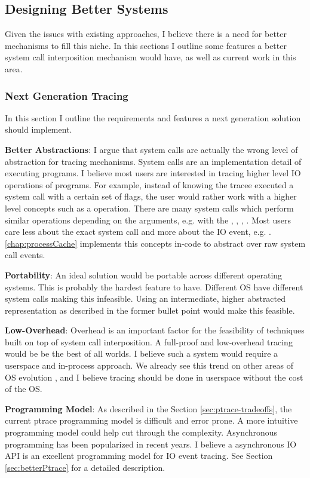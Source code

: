 \subsection{Designing Better Systems}
Given the issues with existing approaches, I believe there is a need for better mechanisms to fill this niche. In this sections I outline some features a better system call interposition mechanism would have, as well as current work in this area.

\subsubsection{Next Generation Tracing}
In this section I outline the requirements and features a next generation solution should implement.
\begin{compactitem}
\item \textbf{Better Abstractions}: I argue that system calls are actually the wrong level of abstraction for tracing mechanisms. System calls are an implementation detail of executing programs. I believe most users are interested in tracing higher level IO operations of programs. For example, instead of knowing the tracee executed a  system call with a certain set of flags, the user would rather work with a higher level concepts such as a  operation. There are many system calls which perform similar operations depending on the arguments, e.g.  with the , , , . Most users care less about the exact system call and more about the IO event, e.g. . \pc \ref{chap:processCache} implements this concepts in-code to abstract over raw system call events. 
\item \textbf{Portability}: An ideal solution would be portable across different operating systems. This is probably the hardest feature to have. Different OS have different system calls making this infeasible. Using an intermediate, higher abstracted representation as described in the former bullet point would make this feasible.
\item \textbf{Low-Overhead}: Overhead is an important factor for the feasibility of techniques built on top of system call interposition. A full-proof and low-overhead tracing would be be the best of all worlds. I believe such a system would require a userspace and in-process approach. We already see this trend on other areas of OS evolution \cite{demikernel}, and I believe tracing should be done in userspace without the cost of the OS.
\item \textbf{Programming Model}: As described in the Section \ref{sec:ptrace-tradeoffs}, the current ptrace programming model is difficult and error prone. A more intuitive programming model could help cut through the complexity. Asynchronous programming has been popularized in recent years. I believe a asynchronous IO API is an excellent programming model for IO event tracing. See Section \ref{sec:betterPtrace} for a detailed description.
\end{compactitem}

